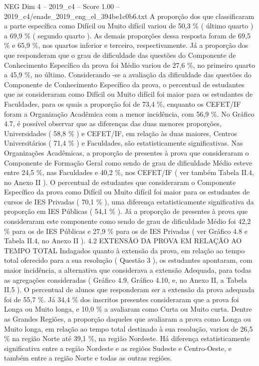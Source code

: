 \begin{textsample}{NEG Dim 4 – 2019\_c4 – Score 1.00 – 2019\_c4/enade\_2019\_eng\_el\_394be1c0b6.txt}
A proporção dos que classificaram a parte específica como Difícil ou Muito difícil variou de 50,3 \% ( último quarto ) a 69,9 \% ( segundo quarto ).
As demais proporções dessa resposta foram de 69,5 \% e 65,9 \%, nos quartos inferior e terceiro, respectivamente.
Já a proporção dos que responderam que o grau de dificuldade das questões do Componente de Conhecimento Específico da prova foi Médio variou de 27,6 \%, no primeiro quarto a 45,9 \%, no último.
Considerando -se a avaliação da dificuldade das questões do Componente de Conhecimento Específico da prova, o percentual de estudantes que as consideraram como Difícil ou Muito difícil foi maior para os estudantes de Faculdades, para os quais a proporção foi de 73,4 \%, enquanto os CEFET/IF foram a Organização Acadêmica com a menor incidência, com 56,9 \%.
No Gráfico 4.7, é possível observar que as diferenças das duas menores proporções, Universidades ( 58,8 \% ) e CEFET/IF, em relação às duas maiores, Centros Universitários ( 71,4 \% ) e Faculdades, são estatisticamente significativas.
Nas Organizações Acadêmicas, a proporção de presentes à prova que consideraram o Componente de Formação Geral como sendo de grau de dificuldade Médio esteve entre 24,5 \%, nas Faculdades e 40,2 \%, nos CEFET/IF ( ver também Tabela II.4, no Anexo II ).
O percentual de estudantes que consideraram o Componente Específico da prova como Difícil ou Muito difícil foi maior para os estudantes de cursos de IES Privadas ( 70,1 \% ), uma diferença estatisticamente significativa da proporção em IES Públicas ( 54,1 \% ).
Já a proporção de presentes à prova que consideraram este componente como sendo de grau de dificuldade Médio foi 42,2 \% para os de IES Públicas e 27,9 \% para os de IES Privadas ( ver Gráfico 4.8 e Tabela II.4, no Anexo II ). 4.2 EXTENSÃO DA PROVA EM RELAÇÃO AO TEMPO TOTAL Indagados quanto à extensão da prova, em relação ao tempo total oferecido para a sua resolução ( Questão 3 ), os estudantes apontaram, com maior incidência, a alternativa que considerava a extensão Adequada, para todas as agregações consideradas ( Gráfico 4.9, Gráfico 4.10, e, no Anexo II, a Tabela II.5 ).
O percentual de alunos que responderam ser a extensão da prova adequada foi de 55,7 \%.
Já 34,4 \% dos inscritos presentes consideraram que a prova foi Longa ou Muito longa, e 10,0 \% a avaliaram como Curta ou Muito curta.
Dentre as Grandes Regiões, a proporção daqueles que avaliaram a prova como Longa ou Muito longa, em relação ao tempo total destinado à sua resolução, variou de 26,5 \% na região Norte até 39,1 \%, na região Nordeste.
Há diferença estatisticamente significativa entre a região Nordeste e as regiões Sudeste e Centro-Oeste, e também entre a região Norte e todas as outras regiões.

\end{textsample}
